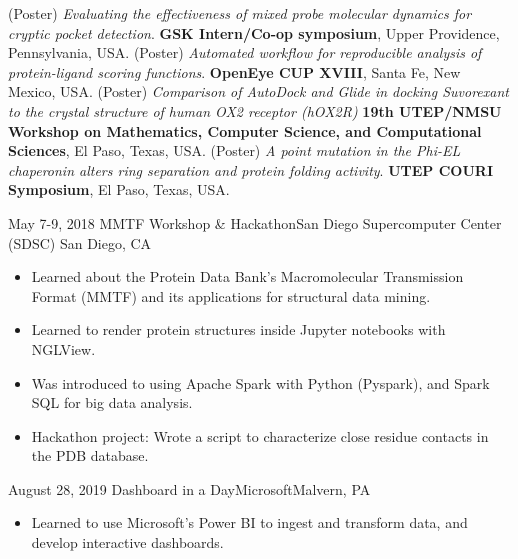 %
%


\begin{scholarship}
					{(Poster) \textit{Evaluating the effectiveness of mixed probe molecular dynamics for cryptic pocket detection}.  \textbf{GSK Intern/Co-op symposium}, Upper Providence, Pennsylvania, USA.}
					{(Poster) \textit{Automated workflow for reproducible analysis of protein-ligand scoring functions}.  \textbf{OpenEye CUP XVIII},  Santa Fe, New Mexico, USA.}
					{(Poster) \textit{Comparison of AutoDock and Glide in docking Suvorexant to the crystal structure of human OX2 receptor (hOX2R)} \textbf{19th UTEP/NMSU Workshop on Mathematics, Computer Science, and Computational Sciences}, El Paso, Texas, USA.}
					{(Poster) \textit{A point mutation in the Phi-EL chaperonin alters ring separation and protein folding activity}.  \textbf{ UTEP COURI Symposium}, El Paso, Texas, USA.}
\end{scholarship}

\begin{experiences}
 \experience
    {May 7-9, 2018} {MMTF Workshop \& Hackathon}{San Diego Supercomputer Center (SDSC)}{ San Diego, CA}
    {}    {
        \begin{itemize}
        \item Learned about the Protein Data Bank's Macromolecular Transmission Format (MMTF) and its applications for structural data mining.
        \item Learned to render protein structures inside Jupyter notebooks with NGLView.
        \item Was introduced to using Apache Spark with Python (Pyspark), and Spark SQL for big data analysis.
        \item Hackathon project: Wrote a script to characterize close residue contacts in the PDB database.
        \end{itemize}
    }

\emptySeparator

\experience
    {August 28, 2019} {Dashboard in a Day}{Microsoft}{Malvern, PA}
    {}    {
        \begin{itemize}
        \item Learned to use Microsoft's Power BI to ingest and transform data, and develop interactive dashboards.
        \end{itemize}
    }
\end{experiences}